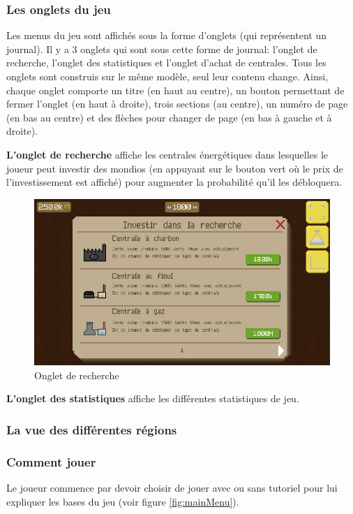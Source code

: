 \documentclass{article}
\begin{document}
		\subsubsection{Les onglets du jeu} \label{onglets}
		Les menus du jeu sont affichés sous la forme d'onglets (qui représentent un journal).
		Il y a 3 onglets qui sont sous cette forme de journal: l'onglet de recherche, l'onglet des statistiques et l'onglet d'achat de centrales.
		Tous les onglets sont construis sur le même modèle, seul leur contenu change. Ainsi, chaque onglet comporte un titre (en haut au centre), un bouton permettant de fermer l'onglet (en haut à droite), trois sections (au centre), un numéro de page (en bas au centre) et des flèches pour changer de page (en bas à gauche et à droite).
		
		
		\textbf{L'onglet de recherche} affiche les centrales énergétiques dans lesquelles le joueur peut investir des mondios (en appuyant sur le bouton vert où le prix de l'investissement est affiché) pour augmenter la probabilité qu'il les débloquera.
		
		\begin{figure}[H]
                \includegraphics[width=\linewidth]{../images/recherche}
                \caption{Onglet de recherche}
                \label{fig:research}
        \end{figure}
        
        
        \textbf{L'onglet des statistiques} affiche les différentes statistiques de jeu. 
		
		\subsubsection{La vue des différentes régions}
        
        \subsubsection{Comment jouer}
        Le joueur commence par devoir choisir de jouer avec ou sans tutoriel pour lui expliquer les bases du jeu (voir figure \ref{fig:mainMenu}). 
        
\end{document}

